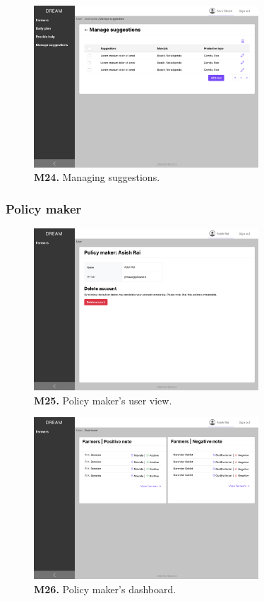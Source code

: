 \begin{figure}[H]
    \centering
    \includegraphics[width=0.75\textwidth]{mockups/Agronomist_Dashboard_Manage suggestions.png}
    \caption{\textbf{M24.} Managing suggestions.}
\end{figure}

\subsubsection{Policy maker}

\begin{figure}[H]
    \centering
    \includegraphics[width=0.75\textwidth]{mockups/Policy maker_User.png}
    \caption{\textbf{M25.} Policy maker's user view.}
\end{figure}

\begin{figure}[H]
    \centering
    \includegraphics[width=0.75\textwidth]{mockups/Policy maker_Dashboard.png}
    \caption{\textbf{M26.} Policy maker's dashboard.}
\end{figure}

